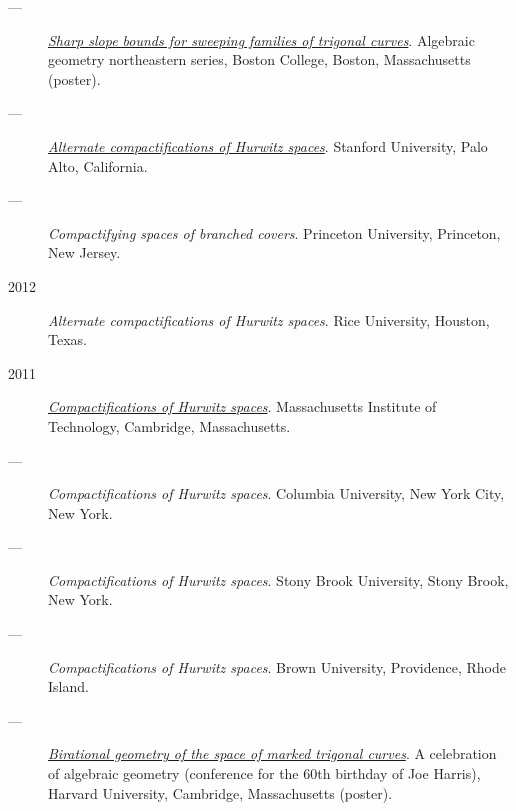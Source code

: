 \documentclass[11pt]{article}
\begin{document}
\begin{description}
\item[{---}] \emph{\href{talks/slopes\_poster.pdf}{Sharp slope bounds for sweeping families of trigonal curves}}. Algebraic geometry northeastern series, Boston College, Boston, Massachusetts (poster).
\item[{---}] \emph{\href{talks/Hdg2013.pdf}{Alternate compactifications of Hurwitz spaces}}. Stanford University, Palo Alto, California.
\item[{---}] \emph{Compactifying spaces of branched covers}. Princeton University, Princeton, New Jersey.
\item[{2012}] \emph{Alternate compactifications of Hurwitz spaces}. Rice University, Houston, Texas.
\item[{2011}] \emph{\href{talks/Hdg2013.pdf}{Compactifications of Hurwitz spaces}}. Massachusetts Institute of Technology, Cambridge, Massachusetts.
\item[{---}] \emph{Compactifications of Hurwitz spaces}. Columbia University, New York City, New York.
\item[{---}] \emph{Compactifications of Hurwitz spaces}. Stony Brook University, Stony Brook, New York.
\item[{---}] \emph{Compactifications of Hurwitz spaces}. Brown University, Providence, Rhode Island.
\item[{---}] \emph{\href{talks/trig\_poster.pdf}{Birational geometry of the space of marked trigonal curves}}. A celebration of algebraic geometry (conference for the 60th birthday of Joe Harris), Harvard University, Cambridge, Massachusetts (poster).
\end{description}
\end{document}
